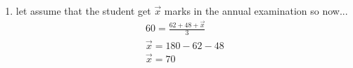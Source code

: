 \renewcommand{\theequation}{\theenumi}
\begin{enumerate}[label=\arabic*.,ref=\thesubsection.\theenumi]

\item let assume that the student get $\vec x$ marks in the annual examination so now...
\begin{align}
60 = \frac{62 +48 + \vec x }{3}
\\
\vec x = 180 -62 - 48
\\
\vec x = 70
\end{align}
\end{enumerate}